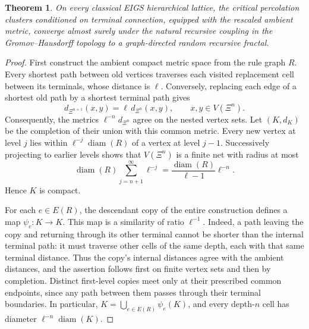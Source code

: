\documentclass[scheme=plain,11pt]{ctexart}
\newtheorem{theorem}{Theorem}[section]
\theoremstyle{definition}
\theoremstyle{remark}
\begin{document}
\begin{theorem}\label{thm:eigs-graph-directed}
On every classical EIGS hierarchical lattice, the critical percolation clusters conditioned on terminal connection, equipped with the rescaled ambient metric, converge almost surely under the natural recursive coupling in the Gromov--Hausdorff topology to a graph-directed random recursive fractal.
\end{theorem}
\begin{proof}
First construct the ambient compact metric space from the rule graph $R$.
Every shortest path between old vertices traverses each visited replacement cell between its terminals, whose distance is $\ell$.
Conversely, replacing each edge of a shortest old path by a shortest terminal path gives
\[
 d_{\Xi^{n+1}}(x,y)=\ell\,d_{\Xi^n}(x,y),
 \qquad x,y\in V(\Xi^n).
\]
Consequently, the metrics $\ell^{-n}d_{\Xi^n}$ agree on the nested vertex sets.
Let $(K,d_K)$ be the completion of their union with this common metric.
Every new vertex at level $j$ lies within $\ell^{-j}\operatorname{diam}(R)$ of a vertex at level $j-1$.
Successively projecting to earlier levels shows that $V(\Xi^n)$ is a finite net with radius at most
\[
 \operatorname{diam}(R)\sum_{j=n+1}^{\infty}\ell^{-j}
 =\frac{\operatorname{diam}(R)}{\ell-1}\ell^{-n}.
\]
Hence $K$ is compact.

For each $e\in E(R)$, the descendant copy of the entire construction defines a map $\psi_e:K\longrightarrow K$.
This map is a similarity of ratio $\ell^{-1}$.
Indeed, a path leaving the copy and returning through its other terminal cannot be shorter than the internal terminal path: it must traverse other cells of the same depth, each with that same terminal distance.
Thus the copy's internal distances agree with the ambient distances, and the assertion follows first on finite vertex sets and then by completion.
Distinct first-level copies meet only at their prescribed common endpoints, since any path between them passes through their terminal boundaries.
In particular, $K=\bigcup_{e\in E(R)}\psi_e(K)$, and every depth-$n$ cell has diameter $\ell^{-n}\operatorname{diam}(K)$.


\end{proof}
\end{document}
